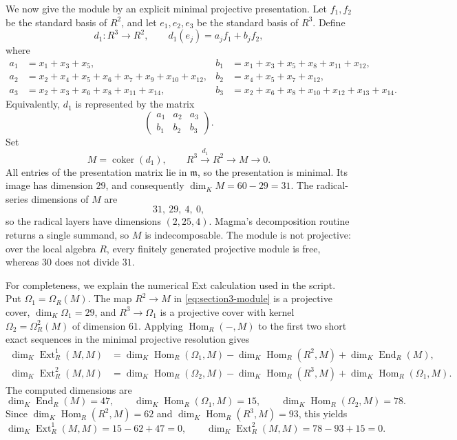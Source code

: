 \documentclass[a4paper]{amsart}
\theoremstyle{definition}
\theoremstyle{remark}
\numberwithin{equation}{section}
\newcommand{\Ext}{\operatorname{Ext}}
\newcommand{\End}{\operatorname{End}}
\newcommand{\Hom}{\operatorname{Hom}}
\begin{document}
We now give the module by an explicit minimal projective presentation.  Let $f_1,f_2$ be the standard basis of $R^2$, and let $e_1,e_2,e_3$ be the standard basis of $R^3$.  Define
\[
 d_1:R^3\longrightarrow R^2,
 \qquad
 d_1(e_j)=a_j f_1+b_j f_2,
\]
where
\begin{align*}
 a_1&=x_1+x_3+x_5,
 &b_1&=x_1+x_3+x_5+x_8+x_{11}+x_{12},\\
 a_2&=x_2+x_4+x_5+x_6+x_7+x_9+x_{10}+x_{12},
 &b_2&=x_4+x_5+x_7+x_{12},\\
 a_3&=x_2+x_3+x_6+x_8+x_{11}+x_{14},
 &b_3&=x_2+x_6+x_8+x_{10}+x_{12}+x_{13}+x_{14}.
\end{align*}
Equivalently, $d_1$ is represented by the matrix
\begin{equation}\label{eq:section3-presentation-matrix}
 \left(\begin{array}{ccc}
 a_1&a_2&a_3\\
 b_1&b_2&b_3
 \end{array}\right).
\end{equation}
Set
\begin{equation}\label{eq:section3-module}
 M=\operatorname{coker}(d_1),
 \qquad
 R^3\xrightarrow{\ d_1\ }R^2\longrightarrow M\longrightarrow0.
\end{equation}
All entries of the presentation matrix lie in $\mathfrak m$, so the presentation is minimal.  Its image has dimension $29$, and consequently $\dim_K M=60-29=31$.  The radical-series dimensions of $M$ are
\[
 31,\ 29,\ 4,\ 0,
\]
so the radical layers have dimensions $(2,25,4)$.  Magma's decomposition routine returns a single summand, so $M$ is indecomposable.  The module is not projective: over the local algebra $R$, every finitely generated projective module is free, whereas $30$ does not divide $31$.

For completeness, we explain the numerical Ext calculation used in the script.  Put $\Omega_1=\Omega_R(M)$.  The map $R^2\to M$ in \eqref{eq:section3-module} is a projective cover, $\dim_K\Omega_1=29$, and $R^3\to\Omega_1$ is a projective cover with kernel $\Omega_2=\Omega_R^2(M)$ of dimension $61$.  Applying $\Hom_R(-,M)$ to the first two short exact sequences in the minimal projective resolution gives
\begin{align*}
 \dim_K\Ext_R^1(M,M)
 &=\dim_K\Hom_R(\Omega_1,M)-\dim_K\Hom_R(R^2,M)
   +\dim_K\End_R(M),\\
 \dim_K\Ext_R^2(M,M)
 &=\dim_K\Hom_R(\Omega_2,M)-\dim_K\Hom_R(R^3,M)
   +\dim_K\Hom_R(\Omega_1,M).
\end{align*}
The computed dimensions are
\[
 \dim_K\End_R(M)=47,\qquad
 \dim_K\Hom_R(\Omega_1,M)=15,\qquad
 \dim_K\Hom_R(\Omega_2,M)=78.
\]
Since $\dim_K\Hom_R(R^2,M)=62$ and $\dim_K\Hom_R(R^3,M)=93$, this yields
\[
 \dim_K\Ext_R^1(M,M)=15-62+47=0,
 \qquad
 \dim_K\Ext_R^2(M,M)=78-93+15=0.
\]
\end{document}
